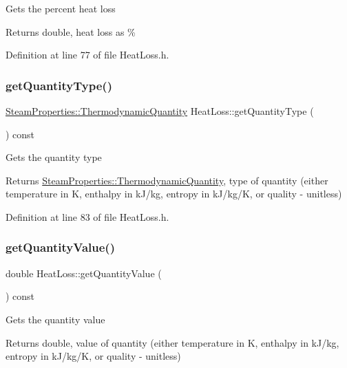 Gets the percent heat loss \begin{DoxyReturn}{Returns}
double, heat loss as \% 
\end{DoxyReturn}


Definition at line 77 of file Heat\+Loss.\+h.

\mbox{\label{class_heat_loss_a92dc973c0fd81df192207b3df55d6c2b}} 
\subsubsection{\texorpdfstring{get\+Quantity\+Type()}{getQuantityType()}}
{\footnotesize\ttfamily \hyperlink{class_steam_properties_ae0294bedf7d178c2d8fb6aed0f62fbff}{Steam\+Properties\+::\+Thermodynamic\+Quantity} Heat\+Loss\+::get\+Quantity\+Type (\begin{DoxyParamCaption}{ }\end{DoxyParamCaption}) const\hspace{0.3cm}{\ttfamily [inline]}}

Gets the quantity type \begin{DoxyReturn}{Returns}
\hyperlink{class_steam_properties_ae0294bedf7d178c2d8fb6aed0f62fbff}{Steam\+Properties\+::\+Thermodynamic\+Quantity}, type of quantity (either temperature in K, enthalpy in k\+J/kg, entropy in k\+J/kg/K, or quality -\/ unitless) 
\end{DoxyReturn}


Definition at line 83 of file Heat\+Loss.\+h.

\mbox{\label{class_heat_loss_a7f7fd85e4fc8bf96dcc213f3dd44ecf7}} 
\subsubsection{\texorpdfstring{get\+Quantity\+Value()}{getQuantityValue()}}
{\footnotesize\ttfamily double Heat\+Loss\+::get\+Quantity\+Value (\begin{DoxyParamCaption}{ }\end{DoxyParamCaption}) const\hspace{0.3cm}{\ttfamily [inline]}}

Gets the quantity value \begin{DoxyReturn}{Returns}
double, value of quantity (either temperature in K, enthalpy in k\+J/kg, entropy in k\+J/kg/K, or quality -\/ unitless) 
\end{DoxyReturn}


